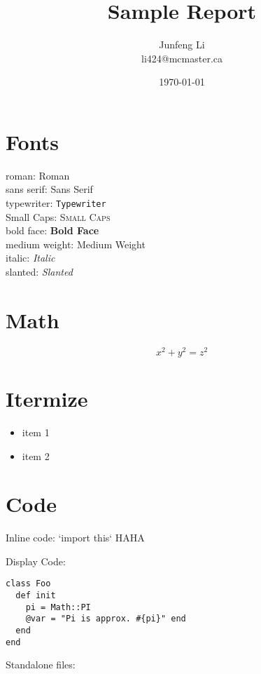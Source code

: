 \documentclass{article}
\title{Sample Report}
\author{Junfeng Li \\ li424@mcmaster.ca}
\date{\today}
\begin{document}
\maketitle

\section{Fonts}

roman: \textrm{Roman} \\
sans serif: \textsf{Sans Serif} \\
typewriter: \texttt{Typewriter} \\
Small Caps: \textsc{Small Caps} \\
bold face: \textbf{Bold Face} \\
medium weight: \textmd{Medium Weight} \\
italic: \textit{Italic} \\
slanted: \textsl{Slanted} \\

\section{Math}

\begin{equation}
x^2 + y^2 = z^2
\end{equation}

\section{Itermize}

\begin{itemize}
\item item 1
\item item 2
\end{itemize}

\section{Code}

Inline code: `import this` HAHA

Display Code:

\begin{verbatim}
class Foo
  def init
    pi = Math::PI
    @var = "Pi is approx. #{pi}" end
  end
end
\end{verbatim}

Standalone files:

\inputminted{python}{code-example.py}
\end{document}
